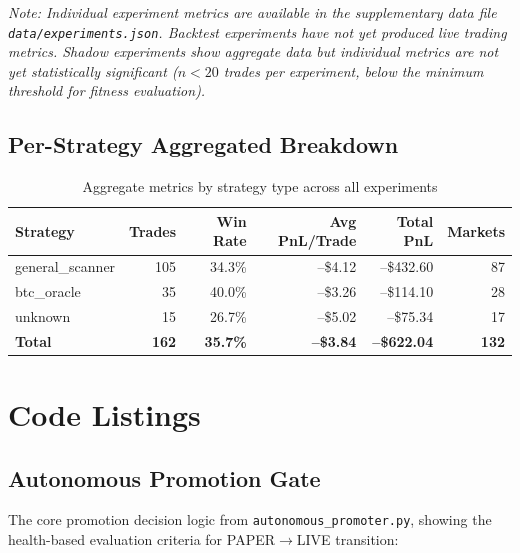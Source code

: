 \documentclass[11pt]{article}
\begin{document}
\begin{longtable}{p{2.5cm}p{1.5cm}p{1.2cm}p{1.8cm}p{1.2cm}p{1.8cm}p{1.5cm}}
\end{longtable}

\noindent\textit{Note: Individual experiment metrics are available in the supplementary data file \texttt{data/experiments.json}. Backtest experiments have not yet produced live trading metrics. Shadow experiments show aggregate data but individual metrics are not yet statistically significant ($n < 20$ trades per experiment, below the minimum threshold for fitness evaluation).}

\subsection{Per-Strategy Aggregated Breakdown}

\begin{table}[h]
\centering
\caption{Aggregate metrics by strategy type across all experiments}
\label{tab:strategy-breakdown}
\begin{tabular}{lrrrrr}
\toprule
Strategy & Trades & Win Rate & Avg PnL/Trade & Total PnL & Markets \\
\midrule
general\_scanner & 105 & 34.3\% & --\$4.12 & --\$432.60 & 87 \\
btc\_oracle & 35 & 40.0\% & --\$3.26 & --\$114.10 & 28 \\
unknown & 15 & 26.7\% & --\$5.02 & --\$75.34 & 17 \\
\midrule
\textbf{Total} & \textbf{162} & \textbf{35.7\%} & \textbf{--\$3.84} & \textbf{--\$622.04} & \textbf{132} \\
\bottomrule
\end{tabular}
\end{table}


\section{Code Listings}
\label{sec:code}

\subsection{Autonomous Promotion Gate}

The core promotion decision logic from \texttt{autonomous\_promoter.py}, showing the health-based evaluation criteria for PAPER$\to$LIVE transition:
\end{document}
